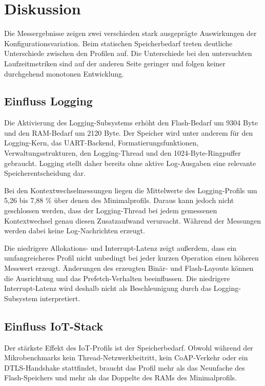 \chapter{Diskussion}
\label{ch:diskussion}

Die Messergebnisse zeigen zwei verschieden stark ausgepr{\"a}gte Auswirkungen der Konfigurationsvariation. Beim statischen Speicherbedarf treten deutliche Unterschiede zwischen den Profilen auf. Die Unterschiede bei den untersuchten Laufzeitmetriken sind auf der anderen Seite geringer und folgen keiner durchgehend monotonen Entwicklung.

\section{Einfluss Logging}
Die Aktivierung des Logging-Subsystems erh{\"o}ht den Flash-Bedarf um 9304 Byte und den RAM-Bedarf um 2120 Byte. Der Speicher wird unter anderem f{\"u}r den Logging-Kern, das UART-Backend, Formatierungsfunktionen, Verwaltungsstrukturen, den Logging-Thread und den 1024-Byte-Ringpuffer gebraucht. Logging stellt daher bereits ohne aktive Log-Ausgaben eine relevante Speicherentscheidung dar.

Bei den Kontextwechselmessungen liegen die Mittelwerte des Logging-Profils um 5,26 bis 7,88 \% {\"u}ber denen des Minimalprofils. Daraus kann jedoch nicht geschlossen werden, dass der Logging-Thread bei jedem gemessenen Kontextwechsel genau diesen Zusatzaufwand verursacht. W{\"a}hrend der Messungen werden dabei keine Log-Nachrichten erzeugt.

Die niedrigere Allokations- und Interrupt-Latenz zeigt au{\ss}erdem, dass ein umfangreicheres Profil nicht unbedingt bei jeder kurzen Operation einen h{\"o}heren Messwert erzeugt. {\"A}nderungen des erzeugten Bin{\"a}r- und Flash-Layouts k{\"o}nnen die Ausrichtung und das Prefetch-Verhalten beeinflussen. Die niedrigere Interrupt-Latenz wird deshalb nicht als Beschleunigung durch das Logging-Subsystem interpretiert.


\section{Einfluss IoT-Stack}
Der st{\"a}rkste Effekt des IoT-Profils ist der Speicherbedarf. Obwohl w{\"a}hrend der Mikrobenchmarks kein Thread-Netzwerkbeitritt, kein CoAP-Verkehr oder ein DTLS-Handshake stattfindet, braucht das Profil mehr als das Neunfache des Flash-Speichers und mehr als das Doppelte des RAMs des Minimalprofils.

